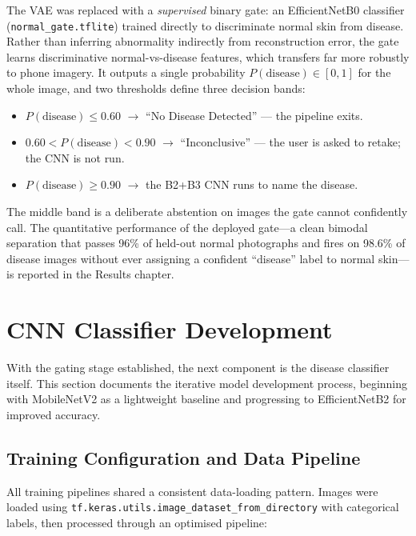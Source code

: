 The VAE was replaced with a \emph{supervised} binary gate: an EfficientNetB0
classifier (\texttt{normal\_gate.tflite}) trained directly to discriminate normal
skin from disease. Rather than inferring abnormality indirectly from
reconstruction error, the gate learns discriminative normal-vs-disease features,
which transfers far more robustly to phone imagery. It outputs a single
probability $P(\text{disease}) \in [0,1]$ for the whole image, and two thresholds
define three decision bands:

\begin{itemize}
    \item $P(\text{disease}) \le 0.60$ $\rightarrow$ ``No Disease Detected'' --- the pipeline exits.
    \item $0.60 < P(\text{disease}) < 0.90$ $\rightarrow$ ``Inconclusive'' --- the user is asked to retake; the CNN is not run.
    \item $P(\text{disease}) \ge 0.90$ $\rightarrow$ the B2+B3 CNN runs to name the disease.
\end{itemize}

\noindent The middle band is a deliberate abstention on images the gate cannot
confidently call. The quantitative performance of the deployed gate---a clean
bimodal separation that passes 96\% of held-out normal photographs and fires on
98.6\% of disease images without ever assigning a confident ``disease'' label to
normal skin---is reported in the Results chapter.


\section{CNN Classifier Development}
\label{sec:cnn}

With the gating stage established, the next component is the disease classifier itself. This section documents the iterative model development process, beginning with MobileNetV2 as a lightweight baseline and progressing to EfficientNetB2 for improved accuracy.

\subsection{Training Configuration and Data Pipeline}
\label{sec:training_config}

All training pipelines shared a consistent data-loading pattern. Images were loaded using \texttt{tf.keras.utils.image\_dataset\_from\_directory} with categorical labels, then processed through an optimised pipeline:

